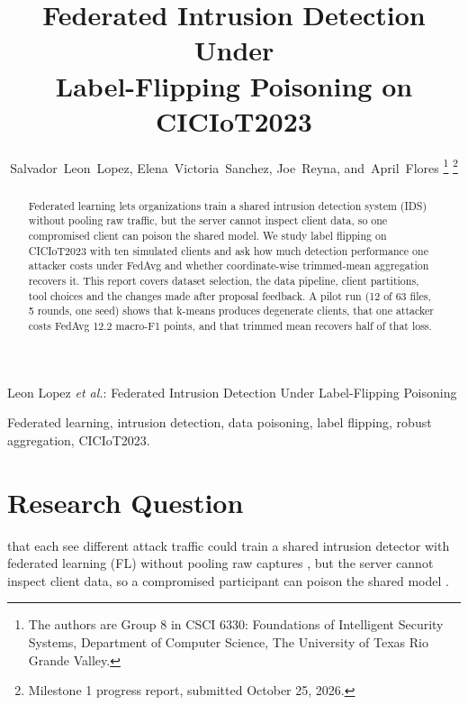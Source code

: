 \documentclass[journal]{IEEEtran}
\begin{document}
\title{Federated Intrusion Detection Under\\ Label-Flipping Poisoning on CICIoT2023}

\author{Salvador~Leon~Lopez, Elena~Victoria~Sanchez, Joe~Reyna, and~April~Flores%
\thanks{The authors are Group 8 in CSCI 6330: Foundations of Intelligent Security Systems, Department of Computer Science, The University of Texas Rio Grande Valley.}%
\thanks{Milestone 1 progress report, submitted October 25, 2026.}}

%
{Leon Lopez \MakeLowercase{\textit{et al.}}: Federated Intrusion Detection Under Label-Flipping Poisoning}

\maketitle

\begin{abstract}
Federated learning lets organizations train a shared intrusion detection system (IDS) without pooling raw traffic, but the server cannot inspect client data, so one compromised client can poison the shared model. We study label flipping on CICIoT2023 with ten simulated clients and ask how much detection performance one attacker costs under FedAvg and whether coordinate-wise trimmed-mean aggregation recovers it. This report covers dataset selection, the data pipeline, client partitions, tool choices and the changes made after proposal feedback. A pilot run (12 of 63 files, 5 rounds, one seed) shows that k-means produces degenerate clients, that one attacker costs FedAvg 12.2 macro-F1 points, and that trimmed mean recovers half of that loss.
\end{abstract}

\begin{IEEEkeywords}
Federated learning, intrusion detection, data poisoning, label flipping, robust aggregation, CICIoT2023.
\end{IEEEkeywords}

\section{Research Question}
 that each see different attack traffic could train a shared
intrusion detector with federated learning (FL) without pooling raw captures
\cite{mcmahan2017}, but the server cannot inspect client data, so a
compromised participant can poison the shared model \cite{tolpegin2020}.
\end{document}
